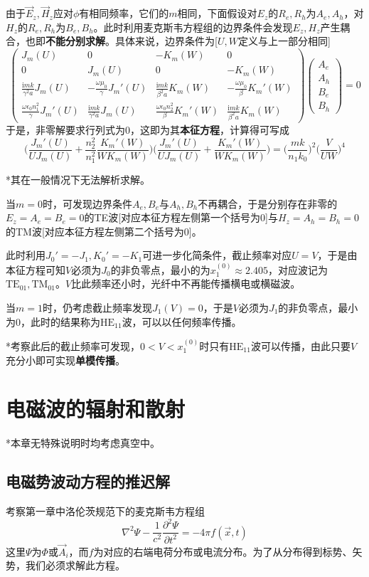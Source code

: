 \documentclass[a4paper,UTF8,fontset=windows]{ctexart}
\newcommand*{\ir}{\mathrm{i}}
\newcommand*{\va}{\vec{A}}
\newcommand*{\ve}{\vec{E}}
\newcommand*{\vh}{\vec{H}}
\newcommand*{\vx}{\vec{x}}
\newcommand*{\ppt}[2][t^2]{\frac{\partial^2 #2}{\partial #1}}
\begin{document}
由于$\ve_z,\vh_z$应对$\phi$有相同频率，它们的$m$相同，下面假设对$E_z$的$R_e,R_h$为$A_e,A_h$，对$H_z$的$R_e,R_h$为$B_e,B_h$。此时利用麦克斯韦方程组的边界条件会发现$E_z,H_z$产生耦合，也即\textbf{不能分别求解}。具体来说，边界条件为[$U,W$定义与上一部分相同]
$$\begin{pmatrix}J_m(U)&0&-K_m(W)&0\\0&J_m(U)&0&-K_m(W)\\\frac{\ir mk}{\gamma^2a}J_m(U)&-\frac{\omega\mu_0}{\gamma}J_m'(U)&\frac{\ir mk}{\beta^2a}K_m(W)&-\frac{\omega\mu_0}{\beta}K_m'(W)\\\frac{\omega\epsilon_0n_1^2}{\gamma}J_m'(U)&\frac{\ir mk}{\gamma^2a}J_m(U)&\frac{\omega\epsilon_0n_2^2}{\beta}K_m'(W)&\frac{\ir mk}{\beta^2a}K_m(W)\end{pmatrix}\begin{pmatrix}A_e\\A_h\\B_e\\B_h\end{pmatrix}=0$$
于是，非零解要求行列式为0，这即为其\textbf{本征方程}，计算得可写成
$$\bigg(\frac{J_m'(U)}{UJ_m(U)}+\frac{n_2^2}{n_1^2}\frac{K_m'(W)}{WK_m(W)}\bigg)\bigg(\frac{J_m'(U)}{UJ_m(U)}+\frac{K_m'(W)}{WK_m(W)}\bigg)=\bigg(\frac{mk}{n_1k_0}\bigg)^2\bigg(\frac{V}{UW}\bigg)^4$$

*其在一般情况下无法解析求解。

当$m=0$时，可发现边界条件$A_e,B_e$与$A_h,B_h$不再耦合，于是分别存在非零的$E_z=A_e=B_e=0$的TE波[对应本征方程左侧第一个括号为0]与$H_z=A_h=B_h=0$的TM波[对应本征方程左侧第二个括号为0]。

此时利用$J_0'=-J_1,K_0'=-K_1$可进一步化简条件，截止频率对应$U=V$，于是由本征方程可知$V$必须为$J_0$的非负零点，最小的为$x_1^{(0)}\approx 2.405$，对应波记为$\text{TE}_{01},\text{TM}_{01}$。$V$比此频率还小时，光纤中不再能传播横电或横磁波。

当$m=1$时，仍考虑截止频率发现$J_1(V)=0$，于是$V$必须为$J_1$的非负零点，最小为0，此时的结果称为$\text{HE}_{11}$波，可以以任何频率传播。

*考察此后的截止频率可发现，$0<V<x_1^{(0)}$时只有$\text{HE}_{11}$波可以传播，由此只要$V$充分小即可实现\textbf{单模传播}。

\section{电磁波的辐射和散射}
*本章无特殊说明时均考虑真空中。

\subsection{电磁势波动方程的推迟解}
考察第一章中洛伦茨规范下的麦克斯韦方程组
$$\nabla^2\Psi-\frac{1}{c^2}\ppt{\Psi}=-4\pi f(\vx,t)$$
这里$\Psi$为$\Phi$或$\va_i$，而$f$为对应的右端电荷分布或电流分布。为了从分布得到标势、矢势，我们必须求解此方程。
\end{document}
